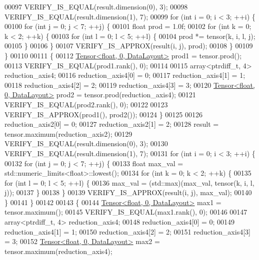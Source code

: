 \begin{DoxyCode}
00097   VERIFY\_IS\_EQUAL(result.dimension(0), 3);
00098   VERIFY\_IS\_EQUAL(result.dimension(1), 7);
00099   \textcolor{keywordflow}{for} (\textcolor{keywordtype}{int} i = 0; i < 3; ++i) \{
00100     \textcolor{keywordflow}{for} (\textcolor{keywordtype}{int} j = 0; j < 7; ++j) \{
00101       \textcolor{keywordtype}{float} prod = 1.0f;
00102       \textcolor{keywordflow}{for} (\textcolor{keywordtype}{int} k = 0; k < 2; ++k) \{
00103         \textcolor{keywordflow}{for} (\textcolor{keywordtype}{int} l = 0; l < 5; ++l) \{
00104           prod *= tensor(k, i, l, j);
00105         \}
00106       \}
00107       VERIFY\_IS\_APPROX(result(i, j), prod);
00108     \}
00109   \}
00110 
00111   \{
00112     \hyperlink{class_eigen_1_1_tensor}{Tensor<float, 0, DataLayout>} prod1 = tensor.prod();
00113     VERIFY\_IS\_EQUAL(prod1.rank(), 0);
00114 
00115     array<ptrdiff\_t, 4> reduction\_axis4;
00116     reduction\_axis4[0] = 0;
00117     reduction\_axis4[1] = 1;
00118     reduction\_axis4[2] = 2;
00119     reduction\_axis4[3] = 3;
00120     \hyperlink{class_eigen_1_1_tensor}{Tensor<float, 0, DataLayout>} prod2 = tensor.prod(reduction\_axis4);
00121     VERIFY\_IS\_EQUAL(prod2.rank(), 0);
00122 
00123     VERIFY\_IS\_APPROX(prod1(), prod2());
00124   \}
00125 
00126   reduction\_axis2[0] = 0;
00127   reduction\_axis2[1] = 2;
00128   result = tensor.maximum(reduction\_axis2);
00129   VERIFY\_IS\_EQUAL(result.dimension(0), 3);
00130   VERIFY\_IS\_EQUAL(result.dimension(1), 7);
00131   \textcolor{keywordflow}{for} (\textcolor{keywordtype}{int} i = 0; i < 3; ++i) \{
00132     \textcolor{keywordflow}{for} (\textcolor{keywordtype}{int} j = 0; j < 7; ++j) \{
00133       \textcolor{keywordtype}{float} max\_val = std::numeric\_limits<float>::lowest();
00134       \textcolor{keywordflow}{for} (\textcolor{keywordtype}{int} k = 0; k < 2; ++k) \{
00135         \textcolor{keywordflow}{for} (\textcolor{keywordtype}{int} l = 0; l < 5; ++l) \{
00136           max\_val = (std::max)(max\_val, tensor(k, i, l, j));
00137         \}
00138       \}
00139       VERIFY\_IS\_APPROX(result(i, j), max\_val);
00140     \}
00141   \}
00142 
00143   \{
00144     \hyperlink{class_eigen_1_1_tensor}{Tensor<float, 0, DataLayout>} max1 = tensor.maximum();
00145     VERIFY\_IS\_EQUAL(max1.rank(), 0);
00146 
00147     array<ptrdiff\_t, 4> reduction\_axis4;
00148     reduction\_axis4[0] = 0;
00149     reduction\_axis4[1] = 1;
00150     reduction\_axis4[2] = 2;
00151     reduction\_axis4[3] = 3;
00152     \hyperlink{class_eigen_1_1_tensor}{Tensor<float, 0, DataLayout>} max2 = tensor.maximum(reduction\_axis4);

\end{DoxyCode}

